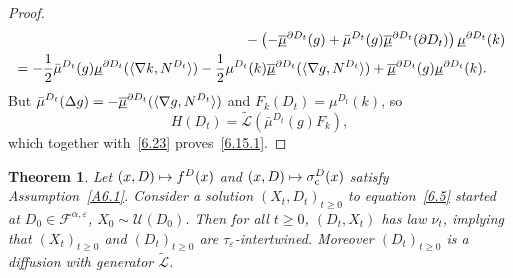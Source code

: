 \documentclass[10pt]{amsart}
\newcommand\mto{\mathchoice{\longmapsto}{\mapsto}{\mapsto}{\mapsto}}
\theoremstyle{plain}
\newtheorem{thm}{Theorem}[section]
\theoremstyle{definition}
\newcommand{\SF}{{\mathscr F}}
\newcommand{\SL}{{\mathscr L}}
\newcommand{\SU}{{\mathscr U}}
\newcommand{\usm}{{\underline{\smash{\mu}}}}
\newcommand{\usbm}{{\underline{\smash{\overline\mu}}}}
\let\di\displaystyle
\let\f\frac
\let\a\alpha
\let\D\Delta
\let\e\varepsilon
\let\n\nabla
\let\pa\partial
\let\wi\widetilde
\begin{document}
\begin{proof}
\begin{align*}
&\hspace*{5.8cm}-\left(-\usbm^{\partial D_t}(g)+\bar\mu^{D_t}(g)\usbm^{\partial D_t}(\partial D_t)\right)\usm^{\pa D_t}(k)\\
&=-\f12\bar\mu^{D_t}(g)\usm^{\partial D_t}(\langle \n k,N^{D_t}\rangle)-\f12 \mu^{D_t}(k)\usbm^{\pa D_t}(\langle \n g, N^{D_t}\rangle )+\usbm^{\partial D_t}(g)\usm^{\partial D_t}(k).
\end{align*}
But $\di \bar\mu^{D_t}(\D g)=-\usbm^{\partial D_t}(\langle\n g,N^{D_t}\rangle)$ and $F_k(D_t)=\mu^{D_t}(k)$, so
\begin{equation}
H(D_t)=\wi\SL(\bar \mu^{D_t}(g)F_k),
\end{equation}
which together with~\eqref{6.23} proves~\eqref{6.15.1}.
\end{proof}

\begin{thm}
\label{C6.2}
Let $(x,D)\mto f^D(x)$ and $(x,D)\mto \sigma_{\mathrm c}^D(x)$ satisfy Assumption~\ref{A6.1}. Consider a solution
$\di \left(X_{t}, D_t\right)_{t\geq 0}$ to equation~\eqref{6.5} started at $D_0\!\in\! \SF^{\a, \e}$, $X_0\!\sim\! \SU(D_0)$. Then
for all $t\ge 0$, $(D_t,X_t)$ has law $\nu_t$, implying that $(X_t)_{t\ge 0}$ and $(D_t)_{t\ge 0}$ are $\tau_\e$\nobreakdash-inter\-twined. Moreover $(D_t)_{t\geq 0}$ is a diffusion with generator $\wi \SL$.
\end{thm}
\end{document}

